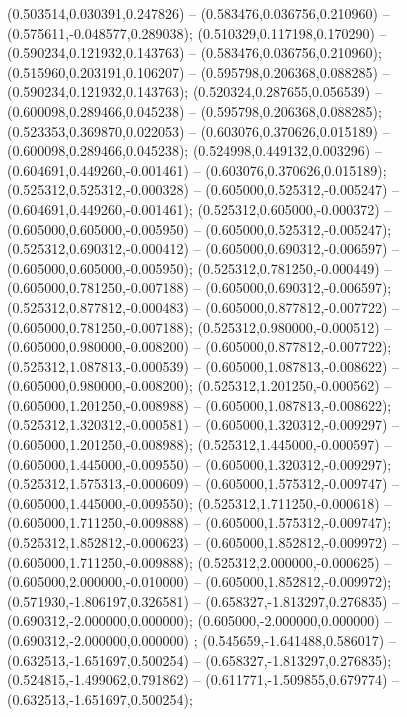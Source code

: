  (0.503514,0.030391,0.247826) -- (0.583476,0.036756,0.210960) -- (0.575611,-0.048577,0.289038);
 (0.510329,0.117198,0.170290) -- (0.590234,0.121932,0.143763) -- (0.583476,0.036756,0.210960);
 (0.515960,0.203191,0.106207) -- (0.595798,0.206368,0.088285) -- (0.590234,0.121932,0.143763);
 (0.520324,0.287655,0.056539) -- (0.600098,0.289466,0.045238) -- (0.595798,0.206368,0.088285);
 (0.523353,0.369870,0.022053) -- (0.603076,0.370626,0.015189) -- (0.600098,0.289466,0.045238);
 (0.524998,0.449132,0.003296) -- (0.604691,0.449260,-0.001461) -- (0.603076,0.370626,0.015189);
 (0.525312,0.525312,-0.000328) -- (0.605000,0.525312,-0.005247) -- (0.604691,0.449260,-0.001461);
 (0.525312,0.605000,-0.000372) -- (0.605000,0.605000,-0.005950) -- (0.605000,0.525312,-0.005247);
 (0.525312,0.690312,-0.000412) -- (0.605000,0.690312,-0.006597) -- (0.605000,0.605000,-0.005950);
 (0.525312,0.781250,-0.000449) -- (0.605000,0.781250,-0.007188) -- (0.605000,0.690312,-0.006597);
 (0.525312,0.877812,-0.000483) -- (0.605000,0.877812,-0.007722) -- (0.605000,0.781250,-0.007188);
 (0.525312,0.980000,-0.000512) -- (0.605000,0.980000,-0.008200) -- (0.605000,0.877812,-0.007722);
 (0.525312,1.087813,-0.000539) -- (0.605000,1.087813,-0.008622) -- (0.605000,0.980000,-0.008200);
 (0.525312,1.201250,-0.000562) -- (0.605000,1.201250,-0.008988) -- (0.605000,1.087813,-0.008622);
 (0.525312,1.320312,-0.000581) -- (0.605000,1.320312,-0.009297) -- (0.605000,1.201250,-0.008988);
 (0.525312,1.445000,-0.000597) -- (0.605000,1.445000,-0.009550) -- (0.605000,1.320312,-0.009297);
 (0.525312,1.575313,-0.000609) -- (0.605000,1.575312,-0.009747) -- (0.605000,1.445000,-0.009550);
 (0.525312,1.711250,-0.000618) -- (0.605000,1.711250,-0.009888) -- (0.605000,1.575312,-0.009747);
 (0.525312,1.852812,-0.000623) -- (0.605000,1.852812,-0.009972) -- (0.605000,1.711250,-0.009888);
 (0.525312,2.000000,-0.000625) -- (0.605000,2.000000,-0.010000) -- (0.605000,1.852812,-0.009972);
 (0.571930,-1.806197,0.326581) -- (0.658327,-1.813297,0.276835) -- (0.690312,-2.000000,0.000000);
 (0.605000,-2.000000,0.000000) -- (0.690312,-2.000000,0.000000) ;
 (0.545659,-1.641488,0.586017) -- (0.632513,-1.651697,0.500254) -- (0.658327,-1.813297,0.276835);
 (0.524815,-1.499062,0.791862) -- (0.611771,-1.509855,0.679774) -- (0.632513,-1.651697,0.500254);
